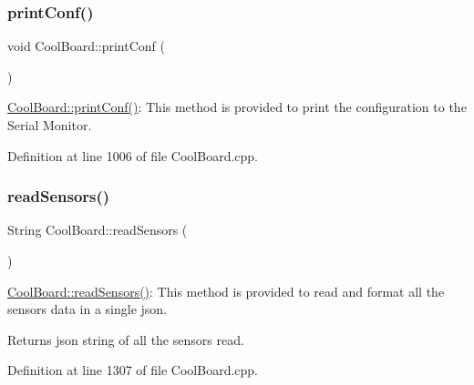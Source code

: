 \subsubsection{\texorpdfstring{print\+Conf()}{printConf()}}
{\footnotesize\ttfamily void Cool\+Board\+::print\+Conf (\begin{DoxyParamCaption}{ }\end{DoxyParamCaption})}

\hyperlink{class_cool_board_a486507b8f0981d3cc671ed31c2145755}{Cool\+Board\+::print\+Conf()}\+: This method is provided to print the configuration to the Serial Monitor. 

Definition at line 1006 of file Cool\+Board.\+cpp.

\mbox{\label{class_cool_board_ad03abdce2e65f520bbf2cff0f2d083cf}} 
\subsubsection{\texorpdfstring{read\+Sensors()}{readSensors()}}
{\footnotesize\ttfamily String Cool\+Board\+::read\+Sensors (\begin{DoxyParamCaption}{ }\end{DoxyParamCaption})}

\hyperlink{class_cool_board_ad03abdce2e65f520bbf2cff0f2d083cf}{Cool\+Board\+::read\+Sensors()}\+: This method is provided to read and format all the sensors data in a single json.

\begin{DoxyReturn}{Returns}
json string of all the sensors read. 
\end{DoxyReturn}


Definition at line 1307 of file Cool\+Board.\+cpp.

